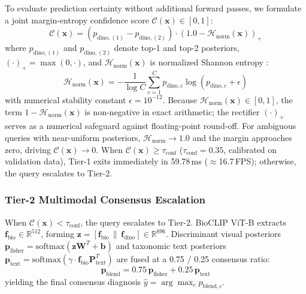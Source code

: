 \documentclass[preprint,12pt]{elsarticle}
\begin{document}
To evaluate prediction certainty without additional forward passes, we formulate a joint margin-entropy confidence score $\mathcal{C}(\mathbf{x}) \in [0, 1]$:
\begin{equation}
    \label{eq:shannon_gate}
    \mathcal{C}(\mathbf{x}) = \left(p_{\text{dino}, (1)} - p_{\text{dino}, (2)}\right) \cdot \left(1.0 - \mathcal{H}_{\text{norm}}(\mathbf{x})\right)_+
\end{equation}
where $p_{\text{dino}, (1)}$ and $p_{\text{dino}, (2)}$ denote top-1 and top-2 posteriors, $(\cdot)_+ = \max(0, \cdot)$, and $\mathcal{H}_{\text{norm}}(\mathbf{x})$ is normalized Shannon entropy \cite{shannon1948mathematical}:
\begin{equation}
    \mathcal{H}_{\text{norm}}(\mathbf{x}) = -\frac{1}{\log C} \sum_{c=1}^C p_{\text{dino}, c} \log(p_{\text{dino}, c} + \epsilon)
\end{equation}
with numerical stability constant $\epsilon = 10^{-12}$. Because $\mathcal{H}_{\text{norm}}(\mathbf{x}) \in [0, 1]$, the term $1 - \mathcal{H}_{\text{norm}}(\mathbf{x})$ is non-negative in exact arithmetic; the rectifier $(\cdot)_+$ serves as a numerical safeguard against floating-point round-off. For ambiguous queries with near-uniform posteriors, $\mathcal{H}_{\text{norm}} \to 1.0$ and the margin approaches zero, driving $\mathcal{C}(\mathbf{x}) \to 0$. When $\mathcal{C}(\mathbf{x}) \ge \tau_{\text{conf}}$ ($\tau_{\text{conf}} = 0.35$, calibrated on validation data), Tier-1 exits immediately in 59.78\,ms ($\approx$16.7\,FPS); otherwise, the query escalates to Tier-2.

\subsubsection{Tier-2 Multimodal Consensus Escalation}
When $\mathcal{C}(\mathbf{x}) < \tau_{\text{conf}}$, the query escalates to Tier-2. BioCLIP ViT-B extracts $\mathbf{f}_{\text{bio}} \in \mathbb{R}^{512}$, forming $\mathbf{z} = [\mathbf{f}_{\text{bio}} \,\|\, \mathbf{f}_{\text{dino}}] \in \mathbb{R}^{896}$. Discriminant visual posteriors $\mathbf{p}_{\text{fisher}} = \text{softmax}(\mathbf{z}\mathbf{W}^T + \mathbf{b})$ and taxonomic text posteriors $\mathbf{p}_{\text{text}} = \text{softmax}(\gamma \cdot \mathbf{f}_{\text{bio}}\mathbf{P}_{\text{text}}^T)$ are fused at a 0.75 / 0.25 consensus ratio:
\begin{equation}
    \label{eq:multimodal_blend}
    \mathbf{p}_{\text{blend}} = 0.75 \, \mathbf{p}_{\text{fisher}} + 0.25 \, \mathbf{p}_{\text{text}}
\end{equation}
yielding the final consensus diagnosis $\hat{y} = \arg\max_c p_{\text{blend}, c}$.
\end{document}
